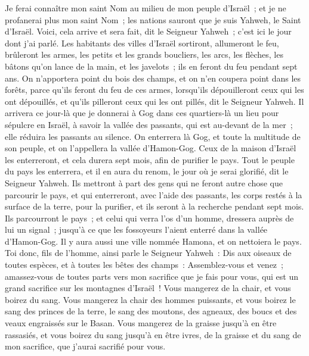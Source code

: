\begin{multicols}{2}
Je ferai connaître mon saint Nom au milieu de mon peuple d'Israël~; et je ne profanerai plus mon saint Nom~; les nations sauront que je suis Yahweh, le Saint d'Israël.
Voici, cela arrive et sera fait, dit le Seigneur Yahweh~; c'est ici le jour dont j'ai parlé.
Les habitants des villes d'Israël sortiront, allumeront le feu, brûleront les armes, les petits et les grands boucliers, les arcs, les flèches, les bâtons qu'on lance de la main, et les javelots~; ils en feront du feu pendant sept ans.
On n'apportera point du bois des champs, et on n'en coupera point dans les forêts, parce qu'ils feront du feu de ces armes, lorsqu'ils dépouilleront ceux qui les ont dépouillés, et qu'ils pilleront ceux qui les ont pillés, dit le Seigneur Yahweh.
Il arrivera ce jour-là que je donnerai à Gog dans ces quartiers-là un lieu pour sépulcre en Israël, à savoir la vallée des passants, qui est au-devant de la mer~; elle réduira les passants au silence. On enterrera là Gog, et toute la multitude de son peuple, et on l'appellera la vallée d'Hamon-Gog.
Ceux de la maison d'Israël les enterreront, et cela durera sept mois, afin de purifier le pays.
Tout le peuple du pays les enterrera, et il en aura du renom, le jour où je serai glorifié, dit le Seigneur Yahweh.
Ils mettront à part des gens qui ne feront autre chose que parcourir le pays, et qui enterreront, avec l'aide des passants, les corps restés à la surface de la terre, pour la purifier, et ils seront à la recherche pendant sept mois.
Ils parcourront le pays~; et celui qui verra l'os d'un homme, dressera auprès de lui un signal~; jusqu'à ce que les fossoyeurs l'aient enterré dans la vallée d'Hamon-Gog.
Il y aura aussi une ville nommée Hamona, et on nettoiera le pays.
Toi donc, fils de l'homme, ainsi parle le Seigneur Yahweh~: Dis aux oiseaux de toutes espèces, et à toutes les bêtes des champs~: Assemblez-vous et venez~; amassez-vous de toutes parts vers mon sacrifice que je fais pour vous, qui est un grand sacrifice sur les montagnes d'Israël~! Vous mangerez de la chair, et vous boirez du sang.
Vous mangerez la chair des hommes puissants, et vous boirez le sang des princes de la terre, le sang des moutons, des agneaux, des boucs et des veaux engraissés sur le Basan.
Vous mangerez de la graisse jusqu'à en être rassasiés, et vous boirez du sang jusqu'à en être ivres, de la graisse et du sang de mon sacrifice, que j'aurai sacrifié pour vous.

\end{multicols}
